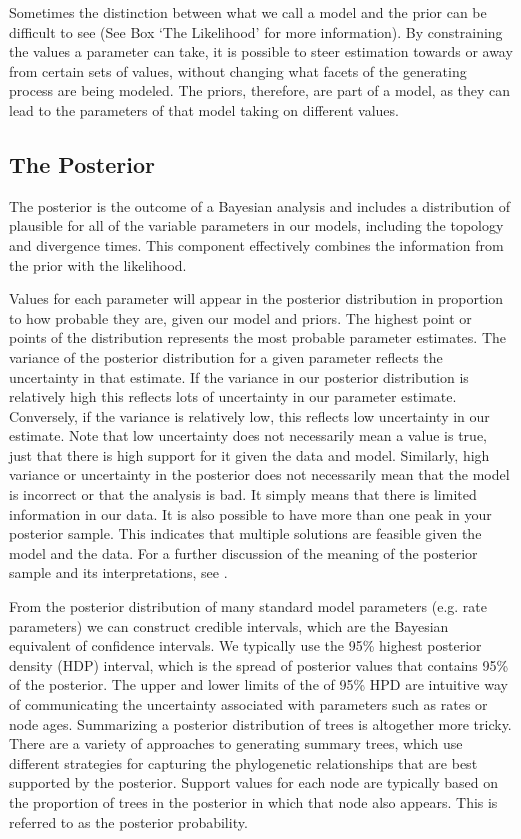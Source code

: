 Sometimes the distinction between what we call a model and the prior can be difficult to see (See Box `The Likelihood' for more information).
By constraining the values a parameter can take, it is possible to steer estimation towards or away from certain sets of values, without changing what facets of the generating process are being modeled. 
The priors, therefore, are part of a model, as they can lead to the parameters of that model taking on different values.

\subsection{The Posterior}

The posterior is the outcome of a Bayesian analysis and includes a distribution of plausible for all of the variable parameters in our models, including the topology and divergence times.
This component effectively combines the information from the prior with the likelihood. %

Values for each parameter will appear in the posterior distribution in proportion to how probable they are, given our model and priors.
The highest point or points of the distribution represents the most probable parameter estimates.
The variance of the posterior distribution for a given parameter reflects the uncertainty in that estimate.
If the variance in our posterior distribution is relatively high this reflects lots of uncertainty in our parameter estimate.
Conversely, if the variance is relatively low, this reflects low uncertainty in our estimate.
Note that low uncertainty does not necessarily mean a value is true, just that there is high support for it given the data and model.
Similarly, high variance or uncertainty in the posterior does not necessarily mean that the model is incorrect or that the analysis is bad. It simply means that there is limited information in our data.
It is also possible to have more than one peak in your posterior sample.
This indicates that multiple solutions are feasible given the model and the data.
For a further discussion of the meaning of the posterior sample and its interpretations, see \cite*{heled2013}.


From the posterior distribution of many standard model parameters (e.g. rate parameters) we can construct credible intervals, which are the Bayesian equivalent of confidence intervals.  
We typically use the 95\% highest posterior density (HDP) interval, which is the spread of posterior values that contains 95\% of the posterior.
The upper and lower limits of the of 95\% HPD are intuitive way of communicating the uncertainty associated with parameters such as rates or node ages.
Summarizing a posterior distribution of trees is altogether more tricky.
There are a variety of approaches to generating summary trees, which use different strategies for capturing the phylogenetic relationships that are best supported by the posterior.
Support values for each node are typically based on the proportion of trees in the posterior in which that node also appears. 
This is referred to as the posterior probability. 

